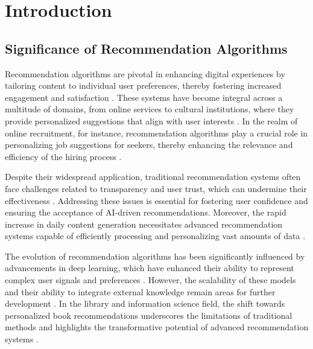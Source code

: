 \section{Introduction} \label{sec:Introduction}


\subsection{Significance of Recommendation Algorithms} \label{subsec:Significance of Recommendation Algorithms}



Recommendation algorithms are pivotal in enhancing digital experiences by tailoring content to individual user preferences, thereby fostering increased engagement and satisfaction . These systems have become integral across a multitude of domains, from online services to cultural institutions, where they provide personalized suggestions that align with user interests . In the realm of online recruitment, for instance, recommendation algorithms play a crucial role in personalizing job suggestions for seekers, thereby enhancing the relevance and efficiency of the hiring process \cite{wu2023exploringlargelanguagemodel}.



Despite their widespread application, traditional recommendation systems often face challenges related to transparency and user trust, which can undermine their effectiveness \cite{albert2024userpreferenceslargelanguage}. Addressing these issues is essential for fostering user confidence and ensuring the acceptance of AI-driven recommendations. Moreover, the rapid increase in daily content generation necessitates advanced recommendation systems capable of efficiently processing and personalizing vast amounts of data \cite{tian2024mmrecllmbasedmultimodal}.



The evolution of recommendation algorithms has been significantly influenced by advancements in deep learning, which have enhanced their ability to represent complex user signals and preferences \cite{wang2023recmind}. However, the scalability of these models and their ability to integrate external knowledge remain areas for further development \cite{wang2023recmind}. In the library and information science field, the shift towards personalized book recommendations underscores the limitations of traditional methods and highlights the transformative potential of advanced recommendation systems \cite{zhiyuli2023bookgptgeneralframeworkbook}.



